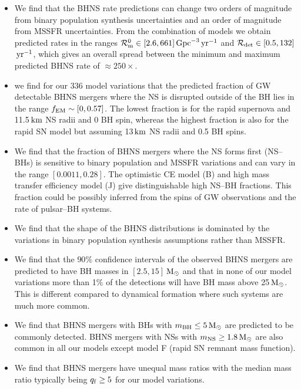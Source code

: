 \documentclass[twocolumn]{aastex63}
\newcommand\bhnsSingle{BHNS\xspace}
\newcommand{\km}{\ensuremath{\,\rm{km}}\xspace}
\newcommand{\Msun}{\ensuremath{\,\rm{M}_{\odot}}\xspace}
\newcommand{\yearmin}{\ensuremath{\,\rm{yr}^{-1}}\xspace}
\newcommand{\GpcminThree}{\ensuremath{\,\rm{Gpc}^{-3}}\xspace}
\newcommand{\mnsf}{\ensuremath{m_{\rm{NS}}}\xspace}
\newcommand{\mbhf}{\ensuremath{m_{\rm{BH}}}\xspace}
\newcommand{\qf}{\ensuremath{q_{\rm{f}}}\xspace}
\newcommand{\Nmodels}{\ensuremath{336}\xspace}
\newcommand{\RateIntrinsicZero}{\ensuremath{\mathcal{R}_{\rm{m}}^{0}}\xspace}
\newcommand{\RateObserved}{\ensuremath{\mathcal{R}_{\rm{det}}}\xspace}
\newcommand{\RateIntrinsicAzeroBHNSmin}{\ensuremath{2.6}\xspace}
\newcommand{\RateIntrinsicAzeroBHNSmax}{\ensuremath{661}\xspace}
\newcommand{\RateObservedAzeroBHNSmax}{\ensuremath{132}\xspace}
\newcommand{\RateObservedAzeroBHNSmin}{\ensuremath{0.5}\xspace}
\begin{document}
\begin{itemize}
\item We find that the \bhnsSingle rate predictions can change two orders of magnitude from binary population synthesis uncertainties and an order of magnitude from \ac{MSSFR} uncertainties. From the combination of models we obtain predicted rates in the ranges $\RateIntrinsicZero \in [ \RateIntrinsicAzeroBHNSmin,  \RateIntrinsicAzeroBHNSmax]\GpcminThree \yearmin$ and $\RateObserved \in [ \RateObservedAzeroBHNSmin,  \RateObservedAzeroBHNSmax]$\yearmin, which gives an overall  spread  between  the minimum and maximum predicted \bhnsSingle rate  of  $\approx 250\times$.


\item we find for our \Nmodels model variations that the predicted fraction of \ac{GW} detectable \bhnsSingle mergers where the \ac{NS} is disrupted outside of the \ac{BH} lies in the range $f_{\rm{EM}} \sim [0, 0.57]$. The lowest fraction is for the rapid supernova and 11.5\km NS radii and 0 \ac{BH} spin, whereas the highest fraction is also for the rapid SN model but assuming 13\km NS radii and 0.5 BH spins. 

\item We find that the fraction of \bhnsSingle mergers where the NS forms first  (NS--BHs) is sensitive to binary population and \ac{MSSFR} variations and can vary in the range $[0.0011, 0.28]$. The optimistic CE model (B) and high mass transfer efficiency model (J) give distinguishable high NS--BH fractions. This fraction could be possibly inferred from the spins of \ac{GW} observations and the rate of pulsar--BH systems. 


\item We find that the shape of the \bhnsSingle distributions is dominated  by the variations in  binary population synthesis assumptions rather than \ac{MSSFR}. 



\item We find that the $90\%$ confidence intervals of the observed \bhnsSingle mergers are predicted to have  \ac{BH} masses in $[2.5, 15]$\Msun and that in none of our model variations more than 1$\%$ of the detections will have BH mass above 25\Msun. This is different compared to dynamical formation where such systems are much more common. 


\item We find that \bhnsSingle mergers with \acp{BH} with $\mbhf \leq 5\Msun$  are predicted to be commonly detected. \bhnsSingle mergers with \acp{NS} with $\mnsf \geq 1.8\Msun$ are also common in all our models except model F (rapid SN remnant mass function). 

\item We find that \bhnsSingle mergers have unequal mass ratios with the median mass ratio typically being $\qf \geq 5$ for our model variations.  


\end{itemize}
\end{document}
